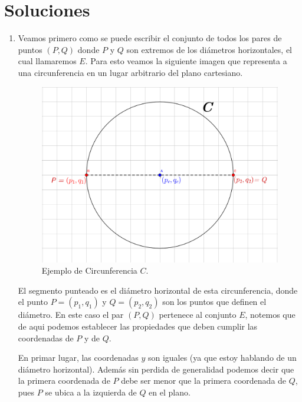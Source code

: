 \documentclass[letterpaper,11pt]{article}
\theoremstyle{plain}
\begin{document}
\newpage

\section{Soluciones}\label{sec:soluciones}

\begin{enumerate}[label=\textbf{S\arabic*.}]
    \item\label{item:S1} Veamos primero como se puede escribir el conjunto de todos los pares de puntos $(P,Q)$ donde $P$ y $Q$ son extremos de los diámetros horizontales, el cual llamaremos $E$. Para esto veamos la siguiente imagen que representa a una circunferencia en un lugar arbitrario del plano cartesiano.
        \begin{figure}[H]
            \centering
            \includegraphics[scale=0.3]{img/p1.png}
            \caption{Ejemplo de Circunferencia \textbf{$C$}.}
            \label{fig:p1}
        \end{figure}
    El segmento punteado es el diámetro horizontal de esta circunferencia, donde el punto $P=(p_1,q_1)$ y $Q=(p_2,q_2)$ son los puntos que definen el diámetro. En este caso el par $(P,Q)$ pertenece al conjunto $E$, notemos que de aqui podemos establecer las propiedades que deben cumplir las coordenadas de $P$ y de $Q$.
    
    En primar lugar, las coordenadas $y$ son iguales (ya que estoy hablando de un diámetro horizontal). Además sin perdida de generalidad podemos decir que la primera coordenada de $P$ debe ser menor que la primera coordenada de $Q$, pues $P$ se ubica a la izquierda de $Q$ en el plano.
    

\end{enumerate}
\end{document}
